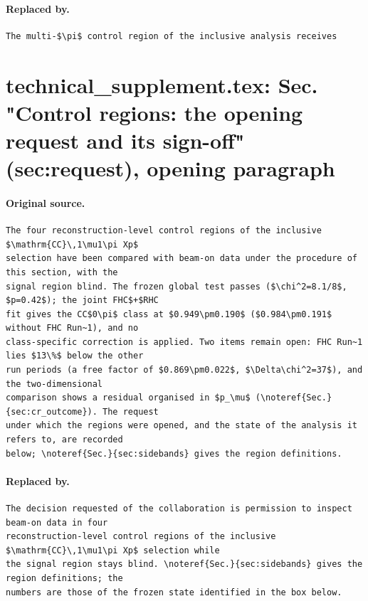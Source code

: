 \documentclass[11pt,a4paper]{article}
\newcommand{\noteref}[2]{#1~\ref{#2} of the analysis note}
\begin{document}
\paragraph{Replaced by.}
\begin{lstlisting}[language={[LaTeX]TeX},basicstyle=\ttfamily\footnotesize,columns=fullflexible]
The multi-$\pi$ control region of the inclusive analysis receives
\end{lstlisting}

\section{technical\_supplement.tex: Sec. "Control regions: the opening request and its sign-off" (sec:request), opening paragraph}
\paragraph{Original source.}
\begin{lstlisting}[language={[LaTeX]TeX},basicstyle=\ttfamily\footnotesize,columns=fullflexible]
The four reconstruction-level control regions of the inclusive $\mathrm{CC}\,1\mu1\pi Xp$
selection have been compared with beam-on data under the procedure of this section, with the
signal region blind. The frozen global test passes ($\chi^2=8.1/8$, $p=0.42$); the joint FHC$+$RHC
fit gives the CC$0\pi$ class at $0.949\pm0.190$ ($0.984\pm0.191$ without FHC Run~1), and no
class-specific correction is applied. Two items remain open: FHC Run~1 lies $13\%$ below the other
run periods (a free factor of $0.869\pm0.022$, $\Delta\chi^2=37$), and the two-dimensional
comparison shows a residual organised in $p_\mu$ (\noteref{Sec.}{sec:cr_outcome}). The request
under which the regions were opened, and the state of the analysis it refers to, are recorded
below; \noteref{Sec.}{sec:sidebands} gives the region definitions.
\end{lstlisting}
\paragraph{Replaced by.}
\begin{lstlisting}[language={[LaTeX]TeX},basicstyle=\ttfamily\footnotesize,columns=fullflexible]
The decision requested of the collaboration is permission to inspect beam-on data in four
reconstruction-level control regions of the inclusive $\mathrm{CC}\,1\mu1\pi Xp$ selection while
the signal region stays blind. \noteref{Sec.}{sec:sidebands} gives the region definitions; the
numbers are those of the frozen state identified in the box below.
\end{lstlisting}
\end{document}

